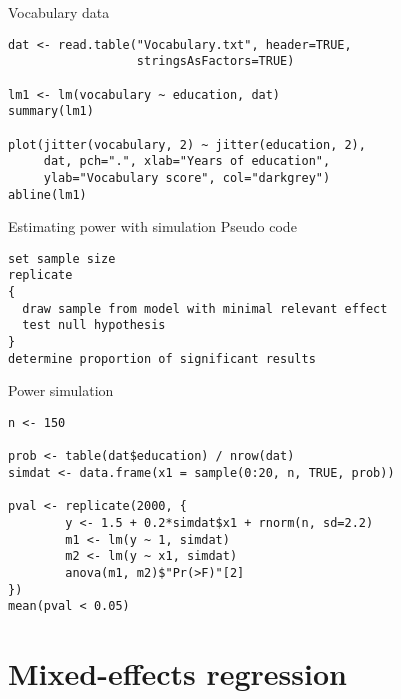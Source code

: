 \documentclass{beamer}
\begin{document}
{

\begin{frame}[fragile]{Vocabulary data}
  \begin{lstlisting}
dat <- read.table("Vocabulary.txt", header=TRUE, 
                  stringsAsFactors=TRUE)

lm1 <- lm(vocabulary ~ education, dat)
summary(lm1)

plot(jitter(vocabulary, 2) ~ jitter(education, 2),
     dat, pch=".", xlab="Years of education",
     ylab="Vocabulary score", col="darkgrey")
abline(lm1)
  \end{lstlisting}
\end{frame}

}

\begin{frame}[fragile]{Estimating power with simulation}
  {Pseudo code}
\begin{lstlisting}[style=plain]
set sample size
replicate
{
  draw sample from model with minimal relevant effect
  test null hypothesis
}
determine proportion of significant results
\end{lstlisting}
\end{frame}

{

\begin{frame}[fragile]{Power simulation}
  \begin{lstlisting}
n <- 150

prob <- table(dat$education) / nrow(dat)
simdat <- data.frame(x1 = sample(0:20, n, TRUE, prob))

pval <- replicate(2000, {
        y <- 1.5 + 0.2*simdat$x1 + rnorm(n, sd=2.2)
        m1 <- lm(y ~ 1, simdat)
        m2 <- lm(y ~ x1, simdat)
        anova(m1, m2)$"Pr(>F)"[2]
})
mean(pval < 0.05)
  \end{lstlisting}
\end{frame}

}

\section{Mixed-effects regression}
\end{document}
